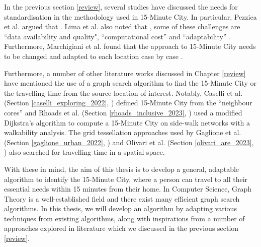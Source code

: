 In the previous section \ref{review}, several studies have discussed the needs for standardisation in the methodology used in 15-Minute City. In particular, Pezzica et al. argued that  \cite{Pezzica_Altafini_Mara_Chioni_2024}. Lima et al. also noted that , some of these challenges are ``data availability and quality", ``computational cost'' and ``adaptability'' \cite{lima_quest_2023}. Furthermore, Marchigiani et al. found that the approach to 15-Minute City needs to be changed and adapted to each location case by case \cite{marchigiani_urban_2022}.

Furthermore, a number of other literature works discussed in Chapter \ref{review} have mentioned the use of a graph search algorithm to find the 15-Minute City or the travelling time from the source location of interest. Notably, Caselli et al. (Section \ref{caselli_exploring_2022}, \cite{caselli_exploring_2022}) defined 15-Minute City from the ``neighbour cores'' and Rhoads et al. (Section \ref{rhoads_inclusive_2023}, \cite{rhoads_inclusive_2023}) used a modified Dijkstra's algorithm to compute a 15-Minute City on side-walk networks with a walkability analysis. The grid tessellation approaches used by Gaglione et al. (Section \ref{gaglione_urban_2022}, \cite{gaglione_urban_2022}) and Olivari et al. (Section \ref{olivari_are_2023}, \cite{olivari_are_2023}) also searched for travelling time in a spatial space.

With these in mind, the aim of this thesis is to develop a general, adaptable algorithm to identify the 15-Minute City, where a person can travel to all their essential needs within 15 minutes from their home. In Computer Science, Graph Theory is a well-established field and there exist many efficient graph search algorithms. In this thesis, we will develop an algorithm by adapting various techniques from existing algorithms, along with inspirations from a number of approaches explored in literature which we discussed in the previous section \ref{review}.

